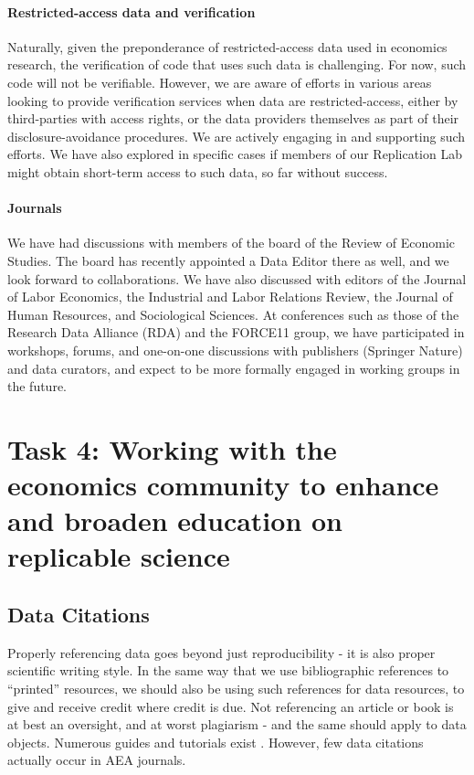 \documentclass[AEJ]{AEA}
\begin{document}
\paragraph{Restricted-access data and verification} Naturally, given the preponderance of restricted-access data used in economics research, the verification of code that uses such data is challenging. For now, such code will not be verifiable. However, we are aware of efforts in various areas looking to provide verification services when data are restricted-access, either by third-parties with access rights, or the data providers themselves as part of their disclosure-avoidance procedures. We  are actively engaging in and supporting such efforts. We have also explored in specific cases if members of our Replication Lab might  obtain short-term access to such data, so far without success.

\paragraph{Journals} We have had discussions with members of the board of the Review of Economic Studies. The board has recently appointed a Data Editor there as well, and we look forward to collaborations. We have also discussed with editors of the Journal of Labor Economics, the Industrial and Labor Relations Review, the Journal of Human Resources, and Sociological Sciences. At conferences such as those of the Research Data Alliance (RDA) and the FORCE11 group, we have participated in workshops, forums, and one-on-one discussions with publishers (Springer Nature) and data curators, and expect to be more formally engaged in working groups in the future. 

\section{Task 4: Working with the economics community to enhance and broaden education on replicable science}

\subsection{Data Citations}
Properly referencing data goes beyond just reproducibility - it is also proper scientific writing style. In the same way that we use bibliographic references to ``printed'' resources, we should also be using such references for data resources, to give and receive credit where credit is due. Not referencing an article or book is at best an oversight, and at worst plagiarism - and the same should apply to data objects. Numerous guides and tutorials exist  \citep{dataone-l09,icpsr-data-cite,force11declaration}. However, few data citations actually occur in AEA journals.
\end{document}
